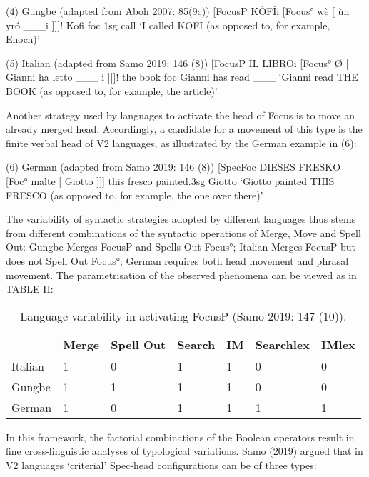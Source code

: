 \documentclass[fleqn,10pt]{wlscirep}
\begin{document}
(4)  	Gungbe (adapted from Aboh 2007: 85(9c))
			[FocusP  	KÒFÍi   [Focus° 	wè 			[	ùn   		yró		___i		]]]!
  							Kofi         			foc        	1sg   	call
			‘I called KOFI (as opposed to, for example, Enoch)’

(5)  	Italian (adapted from Samo 2019: 146 (8))
			[FocusP 		IL LIBROi    [Focus° 	Ø 		[	Gianni 		ha 		letto 	___ i	]]]!
								the book						foc			Gianni 		has 	read 	___
			‘Gianni read THE BOOK (as opposed to, for example, the article)’	

Another strategy used by languages to activate the head of Focus is to move an already merged head. Accordingly, a candidate for a movement of this type is the finite verbal head of V2 languages, as illustrated by the German example in (6):

(6)		German (adapted from Samo 2019: 146 (8))
			[SpecFoc 	DIESES 	FRESKO 	[Foc° 	malte				[	Giotto ]]] 
								this 			fresco					painted.3sg		Giotto 	
			‘Giotto painted THIS FRESCO (as opposed to, for example, the one over there)’

The variability of syntactic strategies adopted by different languages thus stems from different combinations of the syntactic operations of Merge, Move and Spell Out: Gungbe Merges FocusP and Spells Out Focus°; Italian Merges FocusP but does not Spell Out Focus°; German requires both head movement and phrasal movement. The parametrisation of the observed phenomena can be viewed as in TABLE II:

\begin{table}[ht]
    \centering
    \begin{tabular}{|l|l|l|l|l|l|l|}
    \hline
     & Merge & Spell Out & Search & IM & Searchlex & IMlex \\
    \hline
    Italian & 1 & 0 & 1 & 1 & 0 & 0 \\
    \hline
    Gungbe & 1 & 1 & 1 & 1 & 0 & 0 \\
    \hline
    German & 1 & 0 & 1 & 1 & 1 & 1 \\
    \hline
    \end{tabular}
    \caption{\label{tab:samp}Language variability in activating FocusP (Samo 2019: 147 (10)).}
    \end{table}

In this framework, the factorial combinations of the Boolean operators result in fine cross-linguistic analyses of typological variations. Samo (2019) argued that in V2 languages ‘criterial’ Spec-head configurations can be of three types: 
\end{document}
